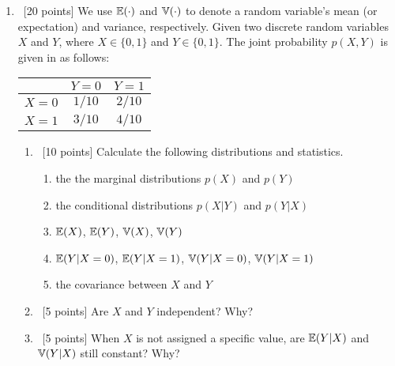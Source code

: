 \documentclass[12pt, fullpage,letterpaper]{article}
\begin{document}
\begin{enumerate}
\item~[20 points]  We use $\mathbb{E}(\cdot)$ and $\mathbb{V}(\cdot)$ to denote a random variable's mean (or expectation) and variance, respectively. Given two discrete random variables $X$ and $Y$, where $X \in \{0, 1\}$ and $Y \in \{0,1\}$. The joint probability $p(X,Y)$ is given in as follows:
\begin{table}[h]
        \centering
        \begin{tabular}{ccc}
        \hline\hline
         & $Y=0$ & $Y=1$ \\ \hline
         $X=0$ & $1/10$ & $2/10$ \\ \hline
         $X=1$  & $3/10$ & $4/10$ \\ \hline\hline
        \end{tabular}
        \end{table}
	
        \begin{enumerate}
            \item~[10 points] Calculate the following distributions and statistics. 
            \begin{enumerate}
            \item the the marginal distributions $p(X)$ and $p(Y)$
            \item the conditional distributions $p(X|Y)$ and $p(Y|X)$
            \item $\mathbb{E}(X)$, $\mathbb{E}(Y)$, $\mathbb{V}(X)$, $\mathbb{V}(Y)$
            \item  $\mathbb{E}(Y|X=0)$, $\mathbb{E}(Y|X=1)$,  $\mathbb{V}(Y|X=0)$, $\mathbb{V}(Y|X=1)$ 
            \item  the covariance between $X$ and $Y$
            \end{enumerate}
            \item~[5 points] Are $X$ and $Y$ independent? Why?
            \item~[5 points] When $X$ is not assigned a specific value, are $\mathbb{E}(Y|X)$ and $\mathbb{V}(Y|X)$ still constant? Why?
        \end{enumerate}
        

\end{enumerate}
\end{document}
